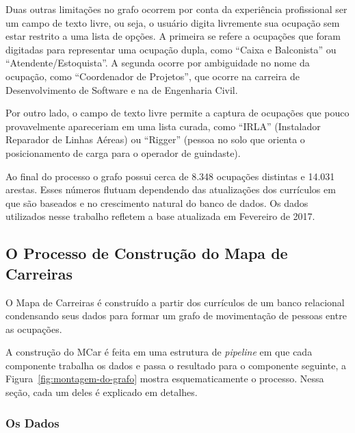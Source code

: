 \documentclass[12pt,a4paper]{article}
\theoremstyle{hypo}
\begin{document}
Duas outras limitações no grafo ocorrem por conta da experiência profissional ser um campo de texto livre, ou seja, o usuário digita livremente sua ocupação sem estar restrito a uma lista de opções. A primeira se refere a ocupações que foram digitadas para representar uma ocupação dupla, como \enquote{Caixa e Balconista} ou \enquote{Atendente/Estoquista}. A segunda ocorre por ambiguidade no nome da ocupação, como \enquote{Coordenador de Projetos}, que ocorre na carreira de Desenvolvimento de Software e na de Engenharia Civil.

Por outro lado, o campo de texto livre permite a captura de ocupações que pouco provavelmente apareceriam em uma lista curada, como \enquote{IRLA} (Instalador Reparador de Linhas Aéreas) ou \enquote{Rigger} (pessoa no solo que orienta o posicionamento de carga para o operador de guindaste).

Ao final do processo o grafo possui cerca de 8.348 ocupações distintas e 14.031 arestas. Esses números flutuam dependendo das atualizações dos currículos em que são baseados e no crescimento natural do banco de dados. Os dados utilizados nesse trabalho refletem a base atualizada em Fevereiro de 2017.


\subsection{O Processo de Construção do Mapa de Carreiras} \label{sec:construcao}

O Mapa de Carreiras é construído a partir dos currículos de um banco relacional condensando seus dados para formar um grafo de movimentação de pessoas entre as ocupações.

A construção do MCar é feita em uma estrutura de \textit{pipeline} em que cada componente trabalha os dados e passa o resultado para o componente seguinte, a Figura~\ref{fig:montagem-do-grafo} mostra esquematicamente o processo. Nessa seção, cada um deles é explicado em detalhes.

\subsubsection{Os Dados}
\end{document}
